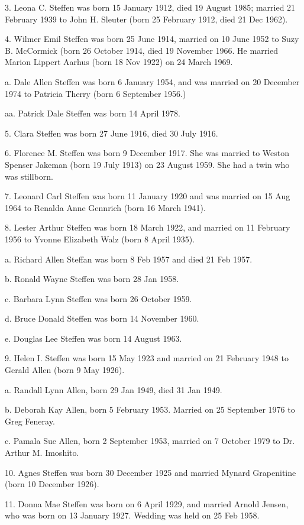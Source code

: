 \documentclass[a4paper]{article}
\begin{document}
3. Leona C. Steffen was born 15 January 1912, died 19 August 1985;  married 21 February 1939 to John H. Sleuter (born 25 February 1912, died 21 Dec 1962).
 
4. Wilmer Emil Steffen was born 25 June 1914, married on 10 June 1952 to Suzy B. McCormick (born 26 October 1914, died 19 November 1966.  He married Marion Lippert Aarhus (born 18 Nov 1922) on 24 March 1969.
  
a. Dale Allen Steffen was born 6 January 1954, and was married on 20 December 1974 to Patricia Therry (born 6 September 1956.)
 
aa. Patrick Dale Steffen was born 14 April 1978.

5. Clara Steffen was born 27 June 1916, died 30 July 1916.

6. Florence M. Steffen was born 9 December 1917.  She was married to Weston Spenser Jakeman (born 19 July 1913)  on 23 August 1959.  She  had a twin who was stillborn.

7. Leonard Carl Steffen was born 11 January 1920 and was married on 15 Aug 1964 to Renalda Anne Gennrich (born 16 March 1941).

8. Lester Arthur Steffen was born 18 March 1922, and married on 11 February 1956 to Yvonne Elizabeth Walz (born 8 April 1935).

a. Richard Allen Steffan was born 8 Feb 1957 and died 21 Feb 1957.

b. Ronald Wayne Steffen was born 28 Jan 1958.

c. Barbara Lynn Steffen was born 26 October 1959.

d. Bruce Donald Steffen was born 14 November 1960.

e. Douglas Lee Steffen was born 14 August 1963.

9. Helen I. Steffen was born 15 May 1923 and married on 21 February 1948 to Gerald Allen (born 9 May 1926).

a. Randall Lynn Allen, born 29 Jan 1949, died 31 Jan 1949.

b. Deborah Kay Allen, born 5 February 1953.  Married on 25 September 1976 to  Greg Feneray.

c.  Pamala Sue Allen, born 2 September 1953, married on 7 October 1979 to Dr. Arthur M. Imoshito.

10. Agnes Steffen was born 30 December 1925 and married Mynard Grapenitine (born 10 December 1926).

11. Donna Mae Steffen was born on 6 April 1929, and married Arnold Jensen, who was born on 13 January 1927.  Wedding was held on 25 Feb 1958. 
\end{document}
